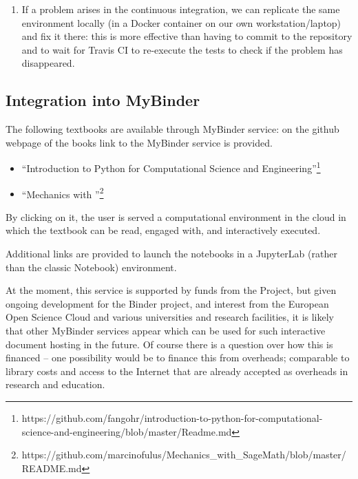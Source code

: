 \documentclass{deliverablereport}
\begin{document}
{{{\begin{itemize}
\begin{enumerate}
  \item If a problem arises in the continuous integration, we can
    replicate the same environment locally (in a Docker container on
    our own workstation/laptop) and fix it there: this is more
    effective than having to commit to the repository and to wait for
    Travis CI to re-execute the tests to check if the problem has
    disappeared.

  \end{enumerate}

\end{itemize}

\subsection{Integration into MyBinder}

The following  textbooks are available through MyBinder service: on the github webpage of the
books link to the MyBinder service is provided.

\begin{itemize}
\item ``Introduction to Python for Computational Science and Engineering''\footnote{https://github.com/fangohr/introduction-to-python-for-computational-science-and-engineering/blob/master/Readme.md}
\item ``Mechanics with \Sage''\footnote{https://github.com/marcinofulus/Mechanics\_with\_SageMath/blob/master/README.md}
\end{itemize}

By clicking on it, the user is served a computational environment in
the cloud in which the textbook can be read, engaged with, and
interactively executed.

Additional links are provided to launch the notebooks in a JupyterLab
(rather than the classic \Jupyter Notebook) environment.

At the moment, this service is supported by funds from the \Jupyter
Project, but given ongoing development for the Binder project, and
interest from the European Open Science Cloud and various universities
and research facilities, it is likely that other MyBinder services
appear which can be used for such interactive document hosting in the
future. Of course there is a question over how this is financed -- one
possibility would be to finance this from overheads; comparable to
library costs and access to the Internet that are already accepted as
overheads in research and education.

}}}
\end{document}
